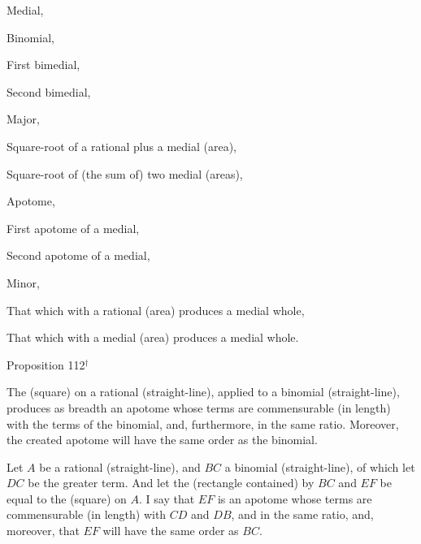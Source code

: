 Medial,\vspace*{-7pt}

Binomial,\vspace*{-7pt}

First bimedial,\vspace*{-7pt}

Second bimedial,\vspace*{-7pt}

Major,\vspace*{-7pt}

Square-root of a rational plus a medial (area),\vspace*{-7pt}

Square-root of (the sum of) two medial (areas),\vspace*{-7pt}

Apotome,\vspace*{-7pt}

First apotome of a medial,\vspace*{-7pt}

Second apotome of a medial,\vspace*{-7pt}

Minor,\vspace*{-7pt}

That which with a rational (area) produces a medial whole,\vspace*{-7pt}

That which with a medial (area) produces a medial whole.


\begin{center}
{\large Proposition 112}$^\dag$
\end{center}

The (square) on a rational (straight-line), applied
to a binomial (straight-line), produces  as breadth an apotome whose terms are commensurable (in length) with the terms of the
binomial, and, furthermore, in the same ratio. Moreover,
the created apotome will have the same order as the binomial.

\epsfysize=0.9in
\centerline{}

Let $A$ be a rational (straight-line), and $BC$ a binomial
(straight-line), of which let $DC$ be the greater term. And let the
(rectangle contained) by $BC$ and $EF$ be equal to the (square) on $A$.
I say that $EF$ is an apotome whose terms are commensurable (in length)
with $CD$ and $DB$, and in the same ratio, and, moreover, that $EF$
will have the same order as $BC$.

